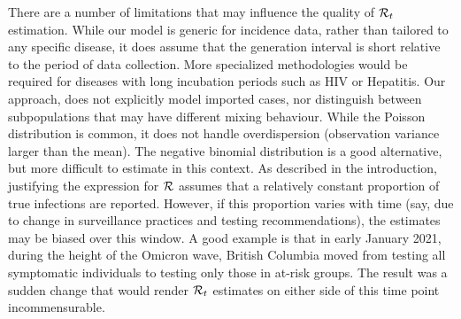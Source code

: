 
There are a number of limitations that may influence the quality of
$\mathcal{R}_t$ estimation.
While our model is
generic for incidence data, rather than tailored to any specific disease,
it does assume that the generation interval is short relative to the
period of data collection. More specialized methodologies would be required for
diseases with long incubation periods such as HIV or Hepatitis. 
Our approach, does not explicitly model imported cases, nor distinguish between
subpopulations that may have different mixing behaviour. 
While the Poisson distribution is common, it does not handle overdispersion
(observation variance larger than the mean). The negative binomial distribution
is a good alternative, but more difficult to estimate in this context.
As described in the introduction, justifying the expression for $\mathcal{R}$ assumes
that a relatively constant proportion of true infections are reported. However,
if this proportion varies with time (say, due to change in surveillance
practices and testing recommendations), the estimates may be biased over this
window. A good example is that in early January 2021, during the height of the
Omicron wave, British Columbia moved from testing all symptomatic individuals to
testing only those in at-risk groups. The result was a sudden change that would
render $\mathcal{R}_t$ estimates on either side of this time point incommensurable.

